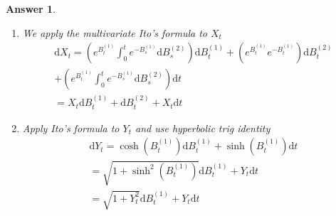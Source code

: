 \documentclass[12pt]{article}
\theoremstyle{colon}
\newtheorem*{answer}{Answer}
\begin{document}
\begin{answer}
  \leavevmode
  \begin{enumerate}[label=\alph*)]
    \item We apply the multivariate Ito's formula to $X_t$
      \begin{gather*}
        \text{d} X_t = \left( e^{B_t^{(1)}} \int_0^t e^{-B_s^{(1)}} \text{d} B_s^{(2)} \right) \text{d} B_t^{(1)} + \left( e^{B_t^{(1)}} e^{-B_t^{(1)}} \right) \text{d} B_t^{(2)} \\
        + \left( e^{B_t^{(1)}} \int_0^t e^{-B_s^{(1)}} \text{d} B_s^{(2)} \right) \text{d} t \\
        = X_t \text{d} B_t^{(1)} + \text{d} B_t^{(2)} + X_t \text{d} t
      \end{gather*}

    \item Apply Ito's formula to $Y_t$ and use hyperbolic trig identity
      \begin{gather*}
        \text{d} Y_t = \cosh \left( B_t^{(1)} \right) \text{d} B_t^{(1)} + \sinh \left( B_t^{(1)} \right) \text{d} t \\
        = \sqrt{1 + \sinh^2 \left( B_t^{(1)} \right)} \text{d} B_t^{(1)} + Y_t \text{d} t \\
        = \sqrt{1 + Y_t^2} \text{d} B_t^{(1)} + Y_t \text{d} t
      \end{gather*}


\end{enumerate}
\end{answer}
\end{document}
